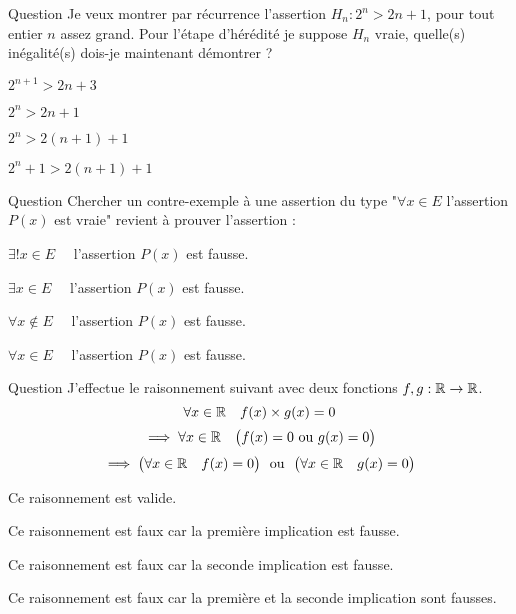 \begin{multi}[multiple,feedback=
{\(H_{n+1}\) s'écrit \(2^{n+1} > 2(n+1)+1\), c'est-à-dire \(2^{n+1} > 2n+3\).
}]{Question}
Je veux montrer par récurrence l'assertion \(H_n : 2^n > 2n+1\), pour tout entier \(n\) assez grand. Pour l'étape d'hérédité je suppose \(H_n\) vraie, quelle(s) inégalité(s) dois-je maintenant démontrer ?

    \item* \(2^{n+1} > 2n+3\)
    \item \(2^{n} > 2n+1\)
    \item \(2^{n} > 2(n+1)+1\)
    \item \(2^{n}+1 > 2(n+1)+1\)
\end{multi}


\begin{multi}[multiple,feedback=
{Un contre-exemple, c'est trouver un \(x\) qui ne vérifie pas \(P(x)\). (Rien ne dit qu'il est unique.)
}]{Question}
Chercher un contre-exemple à une assertion du type 
"\(\forall x \in E\) l'assertion \(P(x)\) est vraie" revient à prouver l'assertion :

    \item \(\exists! x \in E \quad\) l'assertion \(P(x)\) est fausse.
    \item* \(\exists x \in E \quad\) l'assertion \(P(x)\) est fausse.
    \item \(\forall x \notin E \quad\) l'assertion \(P(x)\) est fausse.
    \item \(\forall x \in E \quad\) l'assertion \(P(x)\) est fausse.
\end{multi}


\begin{multi}[multiple,feedback=
{On ne peut pas distribuer un "pour tout" avec un "ou". 
}]{Question}
J'effectue le raisonnement suivant avec deux fonctions \(f,g : \mathbb{R} \to \mathbb{R}\).
\[\forall x \in \mathbb{R} \quad f(x)\times g(x) = 0\] 
\[\implies \forall x \in \mathbb{R} \quad \big(f(x) = 0 \text{ ou } g(x) = 0\big)\]
\[\implies \big(\forall x \in \mathbb{R} \quad f(x) = 0\big) \ \text{ ou } \ \big(\forall x \in \mathbb{R} \quad g(x) = 0\big)\]

    \item Ce raisonnement est valide.
    \item Ce raisonnement est faux car la première implication est fausse.
    \item* Ce raisonnement est faux car la seconde implication est fausse.
    \item Ce raisonnement est faux car la première et la seconde implication sont fausses.
\end{multi}



